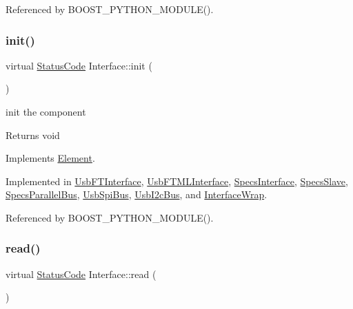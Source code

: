 Referenced by B\+O\+O\+S\+T\+\_\+\+P\+Y\+T\+H\+O\+N\+\_\+\+M\+O\+D\+U\+L\+E().

\mbox{\label{classInterface_a1d095c113b1e89d1f5f68323856fee63}} 
\subsubsection{\texorpdfstring{init()}{init()}}
{\footnotesize\ttfamily virtual \hyperlink{classStatusCode}{Status\+Code} Interface\+::init (\begin{DoxyParamCaption}{ }\end{DoxyParamCaption})\hspace{0.3cm}{\ttfamily [pure virtual]}}

init the component

\begin{DoxyReturn}{Returns}
void 
\end{DoxyReturn}


Implements \hyperlink{classElement_af42754b5cabc198869222725218d695c}{Element}.



Implemented in \hyperlink{classUsbFTInterface_a5371fe7b447850599eaec81a0ffa2ba0}{Usb\+F\+T\+Interface}, \hyperlink{classUsbFTMLInterface_a7f7c96ece97e607b88425823a2923a43}{Usb\+F\+T\+M\+L\+Interface}, \hyperlink{classSpecsInterface_a99ec05cbe0d15892afbec6feaf33c89b}{Specs\+Interface}, \hyperlink{classSpecsSlave_ab34b5117373a334027d3a5cf33287bb6}{Specs\+Slave}, \hyperlink{classSpecsParallelBus_a43d9435450ba71990004638e42eec1ae}{Specs\+Parallel\+Bus}, \hyperlink{classUsbSpiBus_a38203aaf0806b9a1c7cc0686831a7ce9}{Usb\+Spi\+Bus}, \hyperlink{classUsbI2cBus_a595c6e7f618e4f8c6b45e2dcf0fbdabb}{Usb\+I2c\+Bus}, and \hyperlink{structInterfaceWrap_a2660ecdfbabd91d99d7b64c83e92f33c}{Interface\+Wrap}.



Referenced by B\+O\+O\+S\+T\+\_\+\+P\+Y\+T\+H\+O\+N\+\_\+\+M\+O\+D\+U\+L\+E().

\mbox{\label{classInterface_a99136b67c8e6cbcaa0477c36940ac2ef}} 
\subsubsection{\texorpdfstring{read()}{read()}}
{\footnotesize\ttfamily virtual \hyperlink{classStatusCode}{Status\+Code} Interface\+::read (\begin{DoxyParamCaption}\item[{\hyperlink{classIOdata}{I\+Odata} $\ast$}]{ }\end{DoxyParamCaption})\hspace{0.3cm}{\ttfamily [pure virtual]}}



